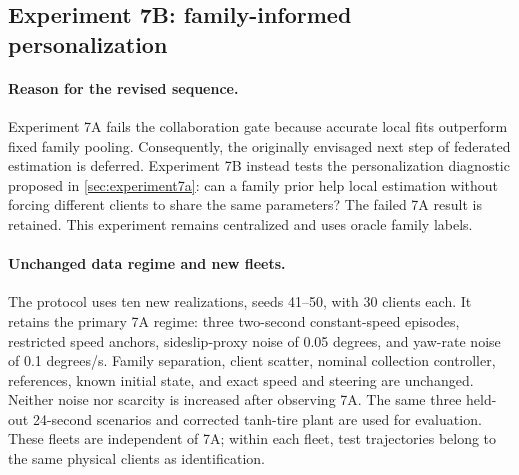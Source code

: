 \subsection{Experiment 7B: family-informed personalization}
\label{sec:experiment7b}

\paragraph{Reason for the revised sequence.}
Experiment 7A fails the collaboration gate because accurate local fits
outperform fixed family pooling. Consequently, the originally envisaged next
step of federated estimation is deferred. Experiment 7B instead tests the
personalization diagnostic proposed in \cref{sec:experiment7a}: can a family
prior help local estimation without forcing different clients to share the
same parameters? The failed 7A result is retained. This experiment remains
centralized and uses oracle family labels.

\paragraph{Unchanged data regime and new fleets.}
The protocol uses ten new realizations, seeds 41--50, with 30 clients each.
It retains the primary 7A regime: three two-second constant-speed episodes,
restricted speed anchors, sideslip-proxy noise of 0.05 degrees, and yaw-rate
noise of 0.1 degrees/s. Family separation, client scatter, nominal collection
controller, references, known initial state, and exact speed and steering are
unchanged. Neither noise nor scarcity is increased after observing 7A.
The same three held-out 24-second scenarios and corrected tanh-tire plant are
used for evaluation. These fleets are independent of 7A; within each fleet,
test trajectories belong to the same physical clients as identification.

